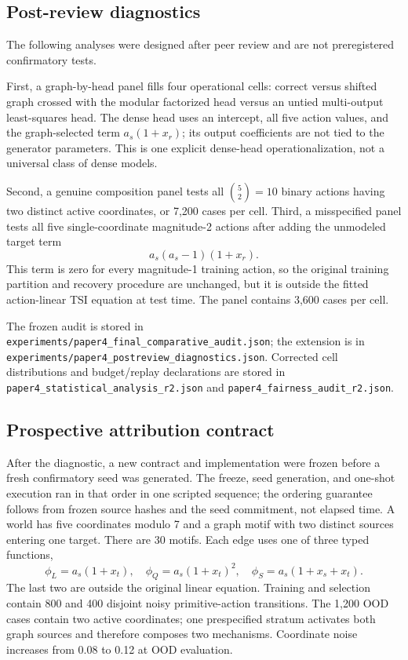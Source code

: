 \subsection{Post-review diagnostics}

The following analyses were designed after peer review and are not
preregistered confirmatory tests.

First, a graph-by-head panel fills four operational cells: correct versus
shifted graph crossed with the modular factorized head versus an untied
multi-output least-squares head.  The dense head uses an intercept, all five
action values, and the graph-selected term \(a_s(1+x_r)\); its output
coefficients are not tied to the generator parameters.  This is one explicit
dense-head operationalization, not a universal class of dense models.

Second, a genuine composition panel tests all \(\binom{5}{2}=10\) binary
actions having two distinct active coordinates, or 7,200 cases per cell.
Third, a misspecified panel tests all five single-coordinate magnitude-2 actions
after adding the unmodeled target term
\[
a_s(a_s-1)(1+x_r).
\]
This term is zero for every magnitude-1 training action, so the original
training partition and recovery procedure are unchanged, but it is outside the
fitted action-linear TSI equation at test time.  The panel contains 3,600 cases
per cell.

The frozen audit is stored in
\texttt{experiments/paper4\_final\_comparative\_audit.json}; the extension is in
\texttt{experiments/paper4\_postreview\_diagnostics.json}.  Corrected cell
distributions and budget/replay declarations are stored in
\texttt{paper4\_statistical\_analysis\_r2.json} and
\texttt{paper4\_fairness\_audit\_r2.json}.

\subsection{Prospective attribution contract}

After the diagnostic, a new contract and implementation were frozen before a
fresh confirmatory seed was generated.  The freeze, seed generation, and
one-shot execution ran in that order in one scripted sequence; the ordering
guarantee follows from frozen source hashes and the seed commitment, not elapsed
time.  A world has five coordinates modulo 7
and a graph motif with two distinct sources entering one target.  There are 30
motifs.  Each edge uses one of three typed functions,
\[
\phi_L=a_s(1+x_t),\quad
\phi_Q=a_s(1+x_t)^2,\quad
\phi_S=a_s(1+x_s+x_t).
\]
The last two are outside the original linear equation.  Training and selection
contain 800 and 400 disjoint noisy primitive-action transitions.  The 1,200
OOD cases contain two active coordinates; one prespecified stratum activates
both graph sources and therefore composes two mechanisms.  Coordinate noise
increases from 0.08 to 0.12 at OOD evaluation.


